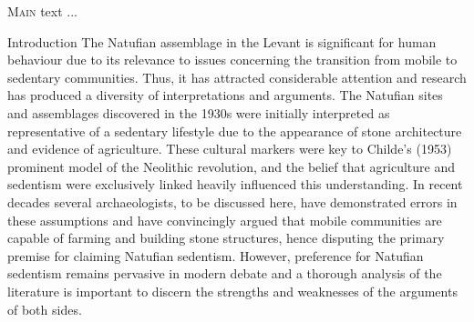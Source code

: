 \documentclass[%
	]{ijsra}
\begin{document}
\IJSRAopening%
\lettrine{M}{ain} text ... 

Introduction
The Natufian assemblage in the Levant is significant for human behaviour due to its relevance to issues concerning the transition from mobile to sedentary communities. Thus, it has attracted considerable attention and research has produced a diversity of interpretations and arguments. The Natufian sites and assemblages discovered in the 1930s were initially interpreted as representative of a sedentary lifestyle due to the appearance of stone architecture and evidence of agriculture. These cultural markers were key to Childe’s (1953) prominent model of the Neolithic revolution, and the belief that agriculture and sedentism were exclusively linked heavily influenced this understanding. In recent decades several archaeologists, to be discussed here, have demonstrated errors in these assumptions and have convincingly argued that mobile communities are capable of farming and building stone structures, hence disputing the primary premise for claiming Natufian sedentism. However, preference for Natufian sedentism remains pervasive in modern debate and a thorough analysis of the literature is important to discern the strengths and weaknesses of the arguments of both sides. 
\end{document}
